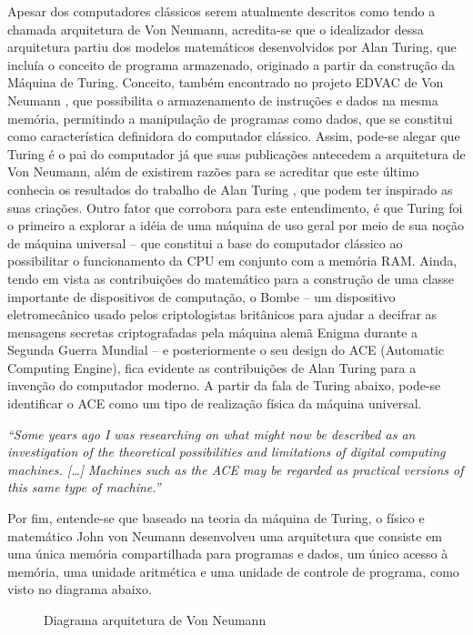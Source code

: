 Apesar dos computadores clássicos serem atualmente descritos como tendo a chamada arquitetura de Von Neumann, acredita-se que o idealizador dessa arquitetura partiu dos modelos matemáticos desenvolvidos por Alan Turing, que incluía o conceito de programa armazenado, originado a partir da construção da Máquina de Turing. Conceito, também encontrado no projeto EDVAC de Von Neumann \cite{9}, que possibilita o armazenamento de instruções e dados na mesma memória, permitindo a manipulação de programas como dados, que se constitui como característica definidora do computador clássico. Assim, pode-se alegar que Turing é o pai do computador já que suas publicações antecedem a arquitetura de Von Neumann, além de existirem razões para se acreditar que este último conhecia os resultados do trabalho de Alan Turing \cite{10}, que podem ter inspirado as suas criações. Outro fator que corrobora para este entendimento, é que Turing foi o primeiro a explorar a idéia de uma máquina de uso geral por meio de sua noção de máquina universal – que constitui a base do computador clássico ao possibilitar o funcionamento da CPU em conjunto com a memória RAM. Ainda, tendo em vista as contribuições do matemático para a construção de uma classe importante de dispositivos de computação, o Bombe – um dispositivo eletromecânico usado pelos criptologistas britânicos para ajudar a decifrar as mensagens secretas criptografadas pela máquina alemã Enigma durante a Segunda Guerra Mundial – e posteriormente o seu design do ACE (Automatic Computing Engine), fica evidente as contribuições de Alan Turing para a invenção do computador moderno. A partir da fala de Turing abaixo, pode-se identificar o ACE como um tipo de realização física da máquina universal.

\textit{
  ``Some years ago I was researching on what might now be described as an investigation of the theoretical possibilities and limitations of digital computing machines. […] Machines such as the ACE may be regarded as practical versions of this same type of machine.'' \cite{11}
}

Por fim, entende-se que baseado na teoria da máquina de Turing, o físico e matemático John von Neumann desenvolveu uma arquitetura que consiste em uma única memória compartilhada para programas e dados, um único acesso à memória, uma unidade aritmética e uma unidade de controle de programa, como visto no diagrama abaixo.

\vspace{1cm}
\begin{figure}[H] \centering 
  \caption{\label{fig:3} Diagrama arquitetura de Von Neumann} 
\end{figure}

